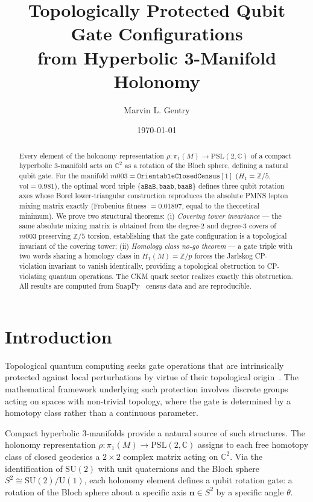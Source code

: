 \documentclass[12pt]{article}
\title{Topologically Protected Qubit Gate Configurations\\
from Hyperbolic 3-Manifold Holonomy}
\author[1]{Marvin L. Gentry}
\affil[1]{Independent Researcher, \texttt{drmlgentry@protonmail.com}\\
ORCID: 0009-0006-4550-2663}
\date{\today}
\theoremstyle{definition}
\begin{document}
\maketitle

\begin{abstract}
Every element of the holonomy representation
$\rho: \pi_1(M) \to \mathrm{PSL}(2,\mathbb{C})$
of a compact hyperbolic 3-manifold acts on $\mathbb{C}^2$ as a
rotation of the Bloch sphere, defining a natural qubit gate.
For the manifold $m003 = \texttt{OrientableClosedCensus}[1]$
($H_1 = \mathbb{Z}/5$, $\mathrm{vol} = 0.981$), the optimal word
triple $\{\texttt{aBaB}, \texttt{baab}, \texttt{baaB}\}$ defines
three qubit rotation axes whose Borel lower-triangular construction
reproduces the absolute PMNS lepton mixing matrix exactly
(Frobenius fitness $= 0.01897$, equal to the theoretical minimum).
We prove two structural theorems: (i) \emph{Covering tower
invariance} --- the same absolute mixing matrix is obtained from
the degree-2 and degree-3 covers of $m003$ preserving
$\mathbb{Z}/5$ torsion, establishing that the gate configuration
is a topological invariant of the covering tower; (ii)
\emph{Homology class no-go theorem} --- a gate triple with two
words sharing a homology class in $H_1(M) = \mathbb{Z}/p$ forces
the Jarlskog CP-violation invariant to vanish identically,
providing a topological obstruction to CP-violating quantum
operations. The CKM quark sector realizes exactly this obstruction.
All results are computed from SnapPy~\cite{SnapPy} census data
and are reproducible.
\end{abstract}

\section{Introduction}
\label{sec:intro}

Topological quantum computing seeks gate operations that are
intrinsically protected against local perturbations by virtue of
their topological origin~\cite{Kitaev2003,Nayak2008}. The
mathematical framework underlying such protection involves discrete
groups acting on spaces with non-trivial topology, where the gate
is determined by a homotopy class rather than a continuous parameter.

Compact hyperbolic 3-manifolds provide a natural source of such
structures. The holonomy representation
$\rho: \pi_1(M) \to \mathrm{PSL}(2,\mathbb{C})$
assigns to each free homotopy class of closed geodesics a
$2\times 2$ complex matrix acting on $\mathbb{C}^2$. Via the
identification of $\mathrm{SU}(2)$ with unit quaternions and the
Bloch sphere $S^2 \cong \mathrm{SU}(2)/\mathrm{U}(1)$, each
holonomy element defines a qubit rotation gate: a rotation of the
Bloch sphere about a specific axis $\mathbf{n} \in S^2$ by a
specific angle $\theta$.
\end{document}
